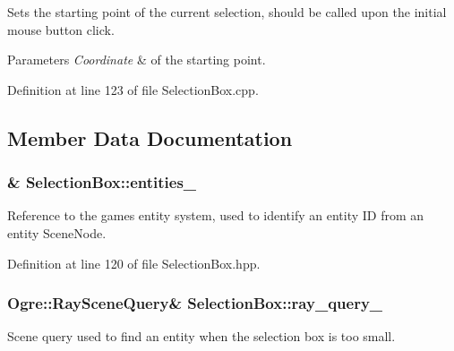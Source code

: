 Sets the starting point of the current selection, should be called upon the initial mouse button click. 


\begin{DoxyParams}{Parameters}
{\em Coordinate} & of the starting point. \\
\hline
\end{DoxyParams}


Definition at line 123 of file Selection\+Box.\+cpp.



\subsection{Member Data Documentation}
\subsubsection[{\texorpdfstring{entities\+\_\+}{entities_}}]{\& Selection\+Box\+::entities\+\_\+\hspace{0.3cm}{\ttfamily [private]}}\hypertarget{class_selection_box_ac0e69cb5092894d810d6084ab9daf305}{}\label{class_selection_box_ac0e69cb5092894d810d6084ab9daf305}


Reference to the game\textquotesingle{}s entity system, used to identify an entity ID from an entity Scene\+Node. 



Definition at line 120 of file Selection\+Box.\+hpp.

\subsubsection[{\texorpdfstring{ray\+\_\+query\+\_\+}{ray_query_}}]{\setlength{\rightskip}{0pt plus 5cm}Ogre\+::\+Ray\+Scene\+Query\& Selection\+Box\+::ray\+\_\+query\+\_\+\hspace{0.3cm}{\ttfamily [private]}}\hypertarget{class_selection_box_a3ff14222f216c6d97f2a1fd7da76f96a}{}\label{class_selection_box_a3ff14222f216c6d97f2a1fd7da76f96a}


Scene query used to find an entity when the selection box is too small. 



